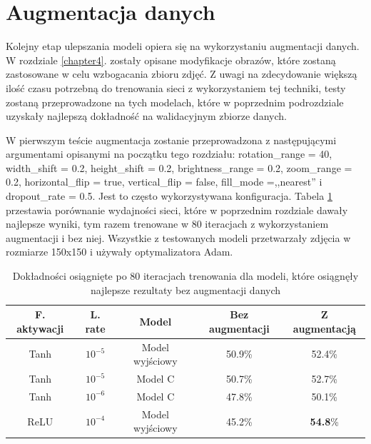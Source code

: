 \section{Augmentacja danych}
Kolejny etap ulepszania modeli opiera się na wykorzystaniu augmentacji danych. W rozdziale \ref{chapter4}. zostały opisane modyfikacje obrazów, które zostaną zastosowane w celu wzbogacania zbioru zdjęć. Z uwagi na zdecydowanie większą ilość czasu potrzebną do trenowania sieci z wykorzystaniem tej techniki, testy zostaną przeprowadzone na tych modelach, które w poprzednim podrozdziale uzyskały najlepszą dokładność na walidacyjnym zbiorze danych.

W pierwszym teście augmentacja zostanie przeprowadzona z następującymi argumentami opisanymi na początku tego rozdziału: rotation\_range = 40, width\_shift = 0.2, height\_shift = 0.2, brightness\_range = 0.2, zoom\_range = 0.2, horizontal\_flip = true, vertical\_flip = false, fill\_mode =,,nearest'' i dropout\_rate = 0.5. Jest to często wykorzystywana konfiguracja. Tabela \ref{tab:5.7} przestawia porównanie wydajności sieci, które w poprzednim rozdziale dawały najlepsze wyniki, tym razem trenowane w 80 iteracjach z wykorzystaniem augmentacji i bez niej. Wszystkie z testowanych modeli przetwarzały zdjęcia w rozmiarze 150x150 i używały optymalizatora Adam.
\begin{table}[H]
  \centering
  \caption{Dokładności osiągnięte po 80 iteracjach trenowania dla modeli, które osiągnęły najlepsze rezultaty bez augmentacji danych}
    \begin{tabular}{ |c|c|c|c|c| }
    \hline
    F. aktywacji & L. rate & Model & Bez augmentacji & Z augmentacją \\
    \hline
    Tanh & $10^{-5}$ & Model wyjściowy & 50.9\% & 52.4\% \\
    Tanh & $10^{-5}$ & Model C & 50.7\% & 52.7\% \\
    Tanh & $10^{-6}$ & Model C & 47.8\% & 50.1\% \\
    ReLU & $10^{-4}$ & Model wyjściowy & 45.2\% & \textbf{54.8}\% \\
    \hline
    \end{tabular}
  \label{tab:5.7}
\end{table}

